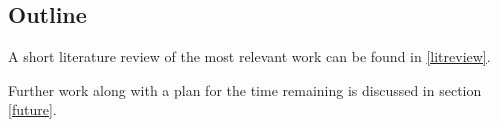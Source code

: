 \subsection{Outline}

 A short literature review of the most relevant work can be found in \ref{litreview}.


Further work along with a plan for the time remaining is discussed in section \ref{future}.
